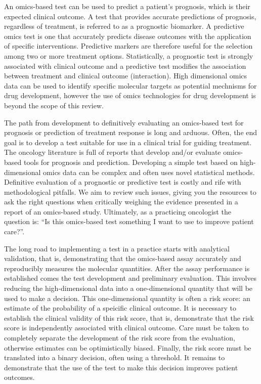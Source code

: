 \documentclass[11pt]{article}
\begin{document}
An omics-based test can be used to predict a patient's prognosis, which
is their expected clinical outcome. A test that provides accurate
predictions of prognosis, regardless of treatment, is referred to as a
prognostic biomarker. A predictive omics test is one that accurately
predicts disease outcomes with the application of specific
interventions. Predictive markers are therefore useful for the selection
among two or more treatment options. Statistically, a prognostic test is
strongly associated with clinical outcome and a predictive test modifies
the association between treatment and clinical outcome (interaction).
High dimensional omics data can be used to identify specific molecular
targets as potential mechnisms for drug development, however the use of
omics technologies for drug development is beyond the scope of this
review.

The path from development to definitively evaluating an omics-based test
for prognosis or prediction of treatment response is long and arduous.
Often, the end goal is to develop a test suitable for use in a clinical
trial for guiding treatment. The oncology literature is full of reports
that develop and/or evaluate omics-based tools for prognosis and
prediction. Developing a simple test based on high-dimensional omics
data can be complex and often uses novel statistical methods. Definitive
evaluation of a prognostic or predictive test is costly and rife with
methodological pitfalls. We aim to review such issues, giving you the
resources to ask the right questions when critically weighing the
evidence presented in a report of an omics-based study. Ultimately, as a
practicing oncologist the question is: ``Is this omics-based test
something I want to use to improve patient care?''.

The long road to implementing a test in a practice starts with
analytical validation, that is, demonstrating that the omics-based assay
accurately and reproducibly measures the molecular quantities. After the
assay performance is established comes the test development and
preliminary evaluation. This involves reducing the high-dimensional data
into a one-dimensional quantity that will be used to make a decision.
This one-dimensional quantity is often a risk score: an estimate of the
probability of a speicific clinical outcome. It is necessary to
establish the clinical validity of this risk score, that is, demonstrate
that the risk score is independently associated with clinical outcome.
Care must be taken to completely separate the development of the risk
score from the evaluation, otherwise estimates can be optimistically
biased. Finally, the risk score must be translated into a binary
decision, often using a threshold. It remains to demonstrate that the
use of the test to make this decision improves patient outcomes.
\end{document}
